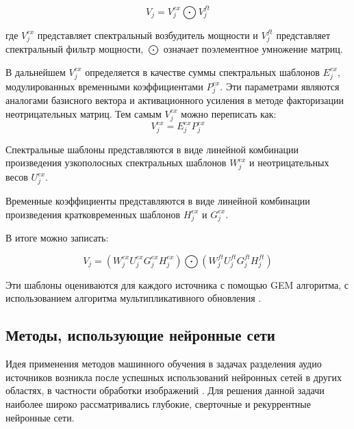\begin{equation}
V_j = V_j^{ex} \bigodot V_j^{ft}
\end{equation}

где $V_j^{ex}$ представляет спектральный возбудитель мощности и $V_j^{ft}$ представляет спектральный фильтр мощности, $\bigodot$ означает поэлементное умножение матриц.

В дальнейшем $V_j^{ex}$ определяется в качестве суммы спектральных шаблонов $E_j^{ex}$, модулированных 	временными коэффициентами $P_j^{ex}$. Эти параметрами являются аналогами базисного вектора и активационного усиления в методе факторизации неотрицательных матриц. Тем самым $V_j^{ex}$ можно переписать как:
\begin{equation}
V_j^{ex} = E_j^{ex}P_j^{ex}
\end{equation}

Спектральные шаблоны представляются в виде линейной комбинации произведения узкополосных спектральных шаблонов $W_j^{ex}$ и неотрицательных весов $U_j^{ex}$.

Временные коэффициенты представляются в виде линейной комбинации произведения кратковременных шаблонов $H_j^{ex}$ и $G_j^{ex}$.

В итоге можно записать:

\begin{equation}
V_j = (W_j^{ex}U_j^{ex}G_j^{ex}H_j^{ex}) \bigodot (W_j^{ft}U_j^{ft}G_j^{ft}H_j^{ft})
\end{equation}

Эти шаблоны оцениваются для каждого источника с помощью GEM алгоритма, с использованием алгоритма мультипликативного обновления \cite{DLee}.

\subsection{Методы, использующие нейронные сети}

Идея применения методов машинного обучения в задачах разделения аудио источников возникла после успешных использований нейронных сетей в других областях, в частности обработки изображений \cite{[Krizhevsky}. Для решения данной задачи наиболее широко рассматривались глубокие, сверточные и рекуррентные нейронные сети.




